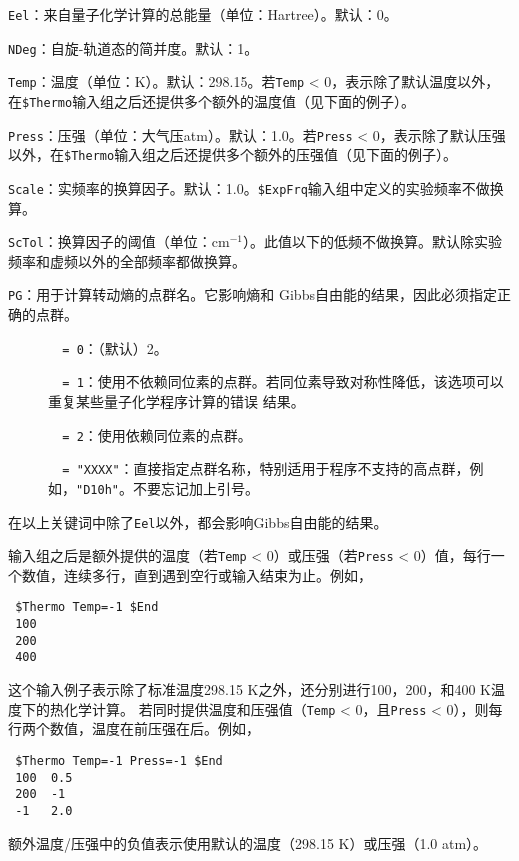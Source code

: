 \documentclass[12pt,a4paper,openany,twoside,cap,UTF8]{ctexbook}
\begin{document}
\bigskip{}\noindent
\verb|Eel|：来自量子化学计算的总能量（单位：Hartree）。默认：0。

\bigskip{}\noindent
\verb|NDeg|：自旋-轨道态的简并度。默认：1。

\bigskip{}\noindent
\verb|Temp|：温度（单位：K）。默认：298.15。若\verb|Temp| < 0，表示除了默认温度以外，在\texttt{\$Thermo}输入组之后还提供多个额外的温度值（见下面的例子）。

\bigskip{}\noindent
\verb|Press|：压强（单位：大气压atm）。默认：1.0。若\verb|Press| < 0，表示除了默认压强以外，在\texttt{\$Thermo}输入组之后还提供多个额外的压强值（见下面的例子）。

\bigskip{}\noindent
\verb|Scale|：实频率的换算因子。默认：1.0。\texttt{\$ExpFrq}输入组中定义的实验频率不做换算。

\bigskip{}\noindent
\verb|ScTol|：换算因子的阈值（单位：cm$^{-1}$）。此值以下的低频不做换算。默认除实验频率和虚频以外的全部频率都做换算。

\bigskip{}\noindent
\verb|PG|：用于计算转动熵的点群名。它影响熵和 Gibbs自由能的结果，因此必须指定正确的点群。
\begin{description}
\item[ ]\verb|  = 0|：（默认）2。
\item[ ]\verb|  = 1|：使用不依赖同位素的点群。若同位素导致对称性降低，该选项可以重复某些量子化学程序计算的错误 结果。
\item[ ]\verb|  = 2|：使用依赖同位素的点群。
\item[ ]\verb|  = "XXXX"|：直接指定点群名称，特别适用于程序不支持的高点群，例如，\verb|"D10h"|。不要忘记加上引号。
\end{description}

在以上关键词中除了\verb|Eel|以外，都会影响Gibbs自由能的结果。

输入组之后是额外提供的温度（若\verb|Temp| < 0）或压强（若\verb|Press| < 0）值，每行一个数值，连续多行，直到遇到空行或输入结束为止。例如，
\begin{colorboxed}[oval=false,boxcolor=blue!75!black,bgcolor=blue!5!white]
\ttfamily
\begin{lstlisting}
 $Thermo Temp=-1 $End
 100
 200
 400
\end{lstlisting}\end{colorboxed}
这个输入例子表示除了标准温度298.15 K之外，还分别进行100，200，和400 K温度下的热化学计算。
若同时提供温度和压强值（\verb|Temp| < 0，且\verb|Press| < 0），则每行两个数值，温度在前压强在后。例如，
\begin{colorboxed}[oval=false,boxcolor=blue!75!black,bgcolor=blue!5!white]
\ttfamily
\begin{lstlisting}
 $Thermo Temp=-1 Press=-1 $End
 100  0.5
 200  -1
 -1   2.0
\end{lstlisting}\end{colorboxed}
额外温度/压强中的负值表示使用默认的温度（298.15 K）或压强（1.0 atm）。
\end{document}
